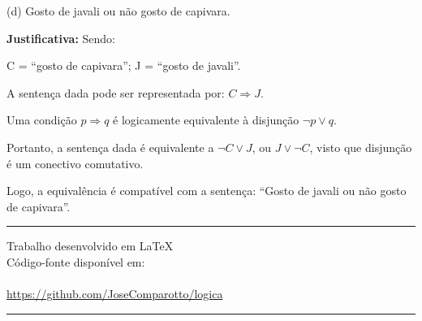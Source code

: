\documentclass[12pt, a4paper, onecolumn]{exam}
\begin{document}
\begin{questions}

    \begin{solution}
        (d) Gosto de javali ou não gosto de capivara.

        \textbf{Justificativa:} Sendo:
        
        C = “gosto de capivara”; \hfill
        J = “gosto de javali”.

        A sentença dada pode ser representada por: \( C \Rightarrow J\).
        
        Uma condição \( p \Rightarrow q \) é logicamente equivalente à disjunção \( \neg p \vee q \).

        Portanto, a sentença dada é equivalente a \( \neg C \vee J \), ou \( J \vee \neg C\), visto que disjunção é um conectivo comutativo.

        Logo, a equivalência é compatível com a sentença: “Gosto de javali ou não gosto de capivara”.
        \end{solution}
    
\end{questions}

\begingroup
    \pagebreak
    \centering

    \rule{\textwidth}{1pt}
    
    \vfill

    \LARGE{Trabalho desenvolvido em LaTeX} \\[1em]
    \large{Código-fonte disponível em:} \\[2em]
    
     \\[2em]

    \large \url{https://github.com/JoseComparotto/logica} 
    
    \vfill

    \rule{\textwidth}{1pt}
    
    \pagebreak

\endgroup
\end{document}
